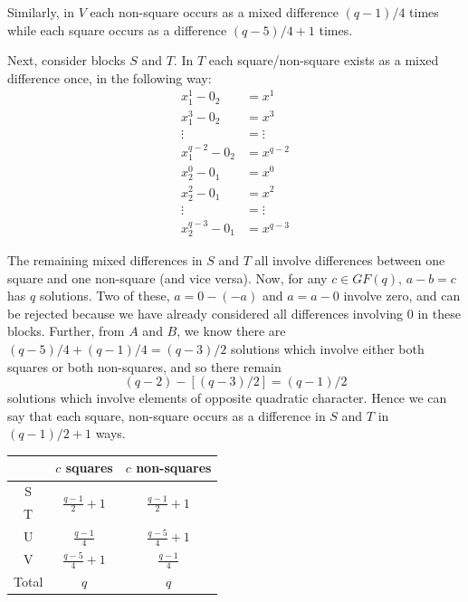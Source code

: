 \documentclass[
  11pt,
  a4paper]{book}\usepackage[]{graphicx}\usepackage[]{xcolor}
\begin{document}
Similarly, in $V$ each non-square occurs as a mixed
difference $(q - 1)/4$ times while each square occurs as a
difference $(q - 5)/4 + 1$ times.

Next, consider blocks $S$
and $T$. In $T$ each square/non-square exists as a mixed
difference once, in the following way:
\begin{align*}
       x_1^1 - 0_2   &= x^1      \\
       x_1^3 - 0_2   &= x^3      \\
           \vdots    &= \vdots   \\             
   x^{q-2}_1 - 0_2   &= x^{q - 2}
\end{align*}
\begin{align*}
       x_2^0 - 0_1   &= x^0      \\
       x_2^2 - 0_1   &= x^2      \\
    \vdots           &= \vdots   \\         
   x^{q-3}_2 - 0_1   &= x^{q-3}
\end{align*}

The remaining mixed differences in $S$ and $T$ all involve
differences between one square and one non-square (and vice
versa). Now, for any $c \in GF(q)$, $a - b = c$ has $q$
solutions. Two of these, $a = 0 - (-a)$ and $a = a - 0$
involve zero, and can be rejected because we have already
considered all differences involving 0 in these blocks.
Further, from $A$ and $B$, we know there are
$(q - 5)/4 + (q - 1)/4 = (q - 3)/2$ solutions which involve
either both squares or both non-squares, and so there remain
\begin{equation}
(q - 2) - [(q - 3)/2] = (q - 1)/2
\end{equation}
solutions which involve elements of opposite quadratic
character. Hence we can say that each square, non-square
occurs as a difference in $S$ and $T$ in $(q - 1)/2 + 1$ ways.

\begin{center}
\begin{tabular}{c|cc}
       & $c$ squares & $c$ non-squares \\ \hline
 S     & \multirow{2}{*}{$\frac{q - 1}{2} + 1$} & \multirow{2}{*}{$\frac{q - 1}{2} + 1$}                                  \\
 T     &                       &                       \\
 U     & $\frac{q - 1}{4}$     & $\frac{q - 5}{4} + 1$ \\
 V     & $\frac{q - 5}{4} + 1$ & $\frac{q - 1}{4}$     \\ \hline
 Total &        $q$            &      $q$
\end{tabular}
\end{center}
\end{document}
